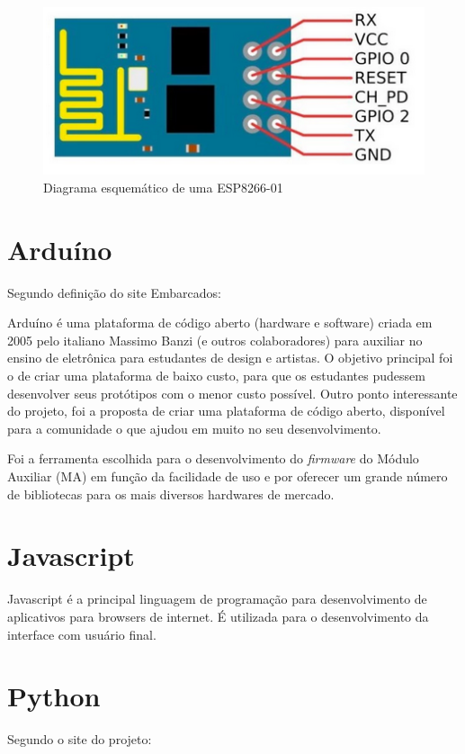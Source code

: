 \begin{figure}[H]
\caption{\label{esp8266}Diagrama esquemático de uma ESP8266-01}
\includegraphics[scale=0.5]{img/esp8266-01f.png}
\end{figure}

\section{Arduíno}
Segundo definição do site Embarcados:

\begin{citacao}
Arduíno é uma plataforma de código aberto (hardware e software) criada em 2005 pelo italiano Massimo Banzi (e outros colaboradores) para auxiliar no ensino de eletrônica para estudantes de design e artistas. O objetivo principal foi o de criar uma plataforma de baixo custo, para que os estudantes pudessem desenvolver seus protótipos com o menor custo possível. Outro ponto interessante do projeto, foi a proposta de criar uma plataforma de código aberto, disponível para a comunidade o que ajudou em muito no seu desenvolvimento. \cite{OQUEARDUINO}
\end{citacao}

Foi a ferramenta escolhida para o desenvolvimento do \textit{firmware} do Módulo Auxiliar (MA) em função da facilidade de uso e por oferecer um grande número de bibliotecas para os mais diversos hardwares de mercado. \cite{Arduino2017}

\section{Javascript}
Javascript é a principal linguagem de programação para desenvolvimento de aplicativos para browsers de internet. É utilizada para o desenvolvimento da interface com usuário final. 

\section{Python}
Segundo o site do projeto:

